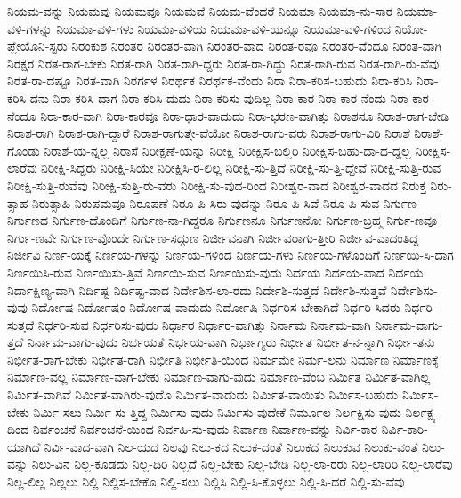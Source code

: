 {ನಿಯಮ-ವನ್ನು
ನಿಯಮವು
ನಿಯಮವೂ
ನಿಯಮವೆ
ನಿಯಮ-ವೆಂದರೆ
ನಿಯಮಾ
ನಿಯಮಾ-ನು-ಸಾರ
ನಿಯಮಾ-ವಳಿ-ಗಳನ್ನು
ನಿಯಮಾ-ವಳಿ-ಗಳು
ನಿಯಮಾ-ವಳಿಯ
ನಿಯಮಾ-ವಳಿ-ಯನ್ನೂ
ನಿಯಮಾ-ವಳಿ-ಗಳಿಂದ
ನಿಯೋ-ಪ್ಲೇಯೊನಿ-ಸ್ಟರು
ನಿರಂಕುಶ
ನಿರಂತರ
ನಿರಂತರ-ವಾಗಿ
ನಿರಂತರ-ವಾದ
ನಿರಂತ-ರವೂ
ನಿರಂತರ-ವೆಂದೂ
ನಿರಂತ-ವಾಗಿ
ನಿರಕ್ಷರ
ನಿರತ-ರಾಗ-ಬೇಕು
ನಿರತ-ರಾಗಿ
ನಿರತ-ರಾಗಿ-ದ್ದರು
ನಿರತ-ರಾ-ಗಿದ್ದು
ನಿರತ-ರಾಗಿ-ರುವ
ನಿರತ-ರಾಗಿ-ರು-ವೆವು
ನಿರತ-ರಾ-ದಷ್ಟೂ
ನಿರತ-ವಾಗಿ
ನಿರರ್ಗಳ
ನಿರರ್ಥಕ
ನಿರರ್ಥಕ-ವೆಂದು
ನಿರಾ
ನಿರಾ-ಕರಿಸ-ಬಹುದು
ನಿರಾ-ಕರಿಸಿ
ನಿರಾ-ಕರಿಸಿ-ದನು
ನಿರಾ-ಕರಿಸಿ-ದಾಗ
ನಿರಾ-ಕರಿಸಿ-ದುದು
ನಿರಾ-ಕರಿಸು-ವುದಿಲ್ಲ
ನಿರಾ-ಕಾರ
ನಿರಾ-ಕಾರ-ನೆಂದು
ನಿರಾ-ಕಾರ-ನೆಂದೂ
ನಿರಾ-ಕಾರ-ವಾಗಿ
ನಿರಾ-ಕಾರವೂ
ನಿರಾ-ಧಾರ-ವಾದುದು
ನಿರಾ-ಭರಣ-ವಾಗಿತ್ತು
ನಿರಾಶನೂ
ನಿರಾಶ-ರಾಗ-ಬೇಡಿ
ನಿರಾಶ-ರಾಗಿ
ನಿರಾಶ-ರಾಗಿ-ದ್ದಾರೆ
ನಿರಾಶ-ರಾಗುತ್ತೇ-ವೆಯೋ
ನಿರಾಶ-ರಾಗು-ವರು
ನಿರಾಶ-ರಾಗು-ವಿರಿ
ನಿರಾಶೆ
ನಿರಾಶೆ-ಗೊಂಡು
ನಿರಾಶೆ-ಯ-ನ್ನಲ್ಲ
ನಿರಾಸೆ
ನಿರೀಕ್ಷಣೆ-ಯನ್ನು
ನಿರೀಕ್ಷಿ
ನಿರೀಕ್ಷಿಸ-ಬಲ್ಲಿರಿ
ನಿರೀಕ್ಷಿಸ-ಬಹು-ದಾ-ದ-ದ್ದಲ್ಲ
ನಿರೀಕ್ಷಿಸ-ಲಾರೆವು
ನಿರೀಕ್ಷಿ-ಸಿದ್ದರು
ನಿರೀಕ್ಷಿ-ಸಿಯೇ
ನಿರೀಕ್ಷಿಸಿ-ರ-ಲಿಲ್ಲ
ನಿರೀಕ್ಷಿ-ಸು-ತ್ತಿದೆ
ನಿರೀಕ್ಷಿ-ಸು-ತ್ತಿ-ದ್ದೇವೆ
ನಿರೀಕ್ಷಿ-ಸುತ್ತಿ-ರುವ
ನಿರೀಕ್ಷಿ-ಸುತ್ತಿ-ರುವೆವು
ನಿರೀಕ್ಷಿ-ಸುತ್ತಿ-ರು-ವರು
ನಿರೀಕ್ಷಿ-ಸು-ವುದ-ರಿಂದ
ನಿರೀಶ್ವರ-ವಾದ
ನಿರೀಶ್ವರ-ವಾದದ
ನಿರುಕ್ತ
ನಿರು-ತ್ಸಾಹ
ನಿರುತ್ಸಾಹಿ
ನಿರುಪಮವೂ
ನಿರೂಪಣೆ
ನಿರೂ-ಪಿ-ಸಿರು-ವುದನ್ನು
ನಿರೂ-ಪಿ-ಸಿವೆ
ನಿರೂ-ಪಿ-ಸುವ
ನಿರ್ಗುಣ
ನಿರ್ಗುಣದ
ನಿರ್ಗುಣ-ದೊಂದಿಗೆ
ನಿರ್ಗುಣ-ನಾ-ಗಿದ್ದರೂ
ನಿರ್ಗುಣನೂ
ನಿರ್ಗುಣನೋ
ನಿರ್ಗುಣ-ಬ್ರಹ್ಮ
ನಿರ್ಗು-ಣವೂ
ನಿರ್ಗು-ಣವೇ
ನಿರ್ಗುಣ-ವೊಂದೇ
ನಿರ್ಗುಣ-ಸದ್ಗುಣ
ನಿರ್ಜೀವನಾಗಿ
ನಿರ್ಜೀವರಾಗು-ತ್ತೀರಿ
ನಿರ್ಜೀವ-ವಾದಂತಿದ್ದ
ನಿರ್ಜೀವಿ
ನಿರ್ಣ-ಯಕ್ಕೆ
ನಿರ್ಣಯ-ಗಳನ್ನು
ನಿರ್ಣಯ-ಗಳಿಂದ
ನಿರ್ಣಯ-ಗಳು
ನಿರ್ಣಯ-ಗಳೊಂದಿಗೆ
ನಿರ್ಣಯಿ-ಸಿ-ದಾಗ
ನಿರ್ಣಯಿಸಿ-ರುವ
ನಿರ್ಣಯಿಸು-ತ್ತಿವೆ
ನಿರ್ಣಯಿ-ಸುವ
ನಿರ್ಣಯಿಸು-ವುದು
ನಿರ್ದಯ
ನಿರ್ದಯ-ವಾದ
ನಿರ್ದಯೆ
ನಿರ್ದಾಕ್ಷಿಣ್ಯ-ವಾಗಿ
ನಿರ್ದಿಷ್ಟ
ನಿರ್ದಿಷ್ಟ-ವಾದ
ನಿರ್ದೇಶಿಸ-ಲಾ-ರದು
ನಿರ್ದೇಶಿ-ಸುತ್ತದೆ
ನಿರ್ದೇಶಿ-ಸುತ್ತವೆ
ನಿರ್ದೇಶಿಸು-ವುವು
ನಿರ್ದೋಷ
ನಿರ್ದೋಷಂ
ನಿರ್ದೋಷ-ವಾದುದು
ನಿರ್ದೋಷಿ
ನಿರ್ಧರಿಸ-ಬೇಕಾಗಿದೆ
ನಿರ್ಧರಿ-ಸಿದರು
ನಿರ್ಧರಿ-ಸುತ್ತದೆ
ನಿರ್ಧರಿ-ಸುವ
ನಿರ್ಧರಿಸು-ವುದು
ನಿರ್ಧಾರ
ನಿರ್ಧಾರ-ವಾಗಿತ್ತು
ನಿರ್ನಾಮ
ನಿರ್ನಾಮ-ವಾಗಿ
ನಿರ್ನಾಮ-ವಾಗು-ತ್ತದೆ
ನಿರ್ನಾಮ-ವಾಗು-ವುದು
ನಿರ್ಭಯತೆ
ನಿರ್ಭಯ-ವಾಗಿ
ನಿರ್ಭಾಗ್ಯರು
ನಿರ್ಭೀತ
ನಿರ್ಭೀತ-ನ-ನ್ನಾಗಿ
ನಿರ್ಭೀ-ತನು
ನಿರ್ಭೀತ-ರಾಗ-ಬೇಕು
ನಿರ್ಭೀತ-ರಾಗಿ
ನಿರ್ಭೀತಿ
ನಿರ್ಭೀತಿ-ಯಿಂದ
ನಿರ್ಮಮೇ
ನಿರ್ಮ-ಲನು
ನಿರ್ಮಾಣ
ನಿರ್ಮಾಣಕ್ಕೆ
ನಿರ್ಮಾಣ-ವಲ್ಲ
ನಿರ್ಮಾಣ-ವಾಗ-ಬೇಕು
ನಿರ್ಮಾಣ-ವಾಗು-ವುದು
ನಿರ್ಮಾಣ-ವೆಂಬ
ನಿರ್ಮಿತ
ನಿರ್ಮಿತ-ವಾಗಿಲ್ಲ
ನಿರ್ಮಿತ-ವಾಗಿವೆ
ನಿರ್ಮಿತ-ವಾಗಿರು-ವುದೊ
ನಿರ್ಮಿತ-ವಾದುದು
ನಿರ್ಮಿತ-ವಾಯಿತು
ನಿರ್ಮಿಸ-ಬಹುದು
ನಿರ್ಮಿಸ-ಬೇಕು
ನಿರ್ಮಿ-ಸಲು
ನಿರ್ಮಿ-ಸು-ತ್ತಿದ್ದ
ನಿರ್ಮಿಸು-ವುದು
ನಿರ್ಮಿಸು-ವುದೇಕೆ
ನಿರ್ಮೂಲ
ನಿರ್ಲಕ್ಷಿಸು-ವುದು
ನಿರ್ಲಕ್ಷ್ಯ-ದಿಂದ
ನಿರ್ವಂಚನೆ
ನಿರ್ವಂಚನೆ-ಯಿಂದ
ನಿರ್ವಹಿ-ಸು-ವುದು
ನಿರ್ವಾಣ
ನಿರ್ವಾಣ-ವನ್ನು
ನಿರ್ವಿ-ಕಾರ
ನಿರ್ವಿ-ಕಾರಿ-ಯಾಗಿದೆ
ನಿರ್ವಿ-ವಾದ-ವಾಗಿ
ನಿಲ-ಯದ
ನಿಲವು
ನಿಲು-ಕದ
ನಿಲುಕ-ದಂತೆ
ನಿಲುಕದೆ
ನಿಲುಕುವ
ನಿಲುಕು-ವಂತೆ
ನಿಲು-ವನ್ನು
ನಿಲು-ವಿನ
ನಿಲ್ಲ-ಕೂಡದು
ನಿಲ್ಲ-ದಿರಿ
ನಿಲ್ಲದೆ
ನಿಲ್ಲ-ಬೇಕು
ನಿಲ್ಲ-ಬೇಡಿ
ನಿಲ್ಲ-ಲಾ-ರರು
ನಿಲ್ಲ-ಲಾರಿರಿ
ನಿಲ್ಲ-ಲಾರೆವು
ನಿಲ್ಲ-ಲಿಲ್ಲ
ನಿಲ್ಲಲು
ನಿಲ್ಲಿ
ನಿಲ್ಲಿಸ-ಬೇಕೊ
ನಿಲ್ಲಿ-ಸಲು
ನಿಲ್ಲಿಸಿ
ನಿಲ್ಲಿ-ಸಿ-ಕೊಳ್ಳಲು
ನಿಲ್ಲಿ-ಸಿ-ದರೆ
ನಿಲ್ಲಿ-ಸು-ವೆವು
}
